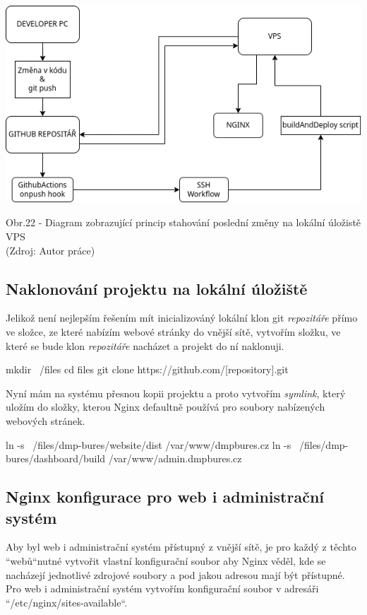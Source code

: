 \documentclass[12pt,a4paper]{report}
\begin{document}
  \vspace*{0.5cm}
  \noindent\includegraphics[width=\linewidth]{CIDC_visualization.png}
  \begin{center}
    Obr.22 - Diagram zobrazující princip stahování poslední změny na lokální úložistě VPS \\
    (Zdroj: Autor práce)
  \end{center}
  \vspace*{0.5cm}

  \subsection{Naklonování projektu na lokální úložiště}
  Jelikož není nejlepším řešením mít inicializováný lokální klon git \emph{repozitáře} přímo ve složce, ze které 
  nabízím webové stránky do vnější sítě, vytvořím složku, ve které se bude klon \emph{repozitáře} nacházet a projekt do ní naklonuji.
  \begin{bash}
    mkdir ~/files
    cd files
    git clone https://github.com/[repository].git 
  \end{bash}
  
  Nyní mám na systému přesnou kopii projektu a proto vytvořím \emph{symlink}, který uložím do složky,
  kterou Nginx defaultně používá pro soubory nabízených webových stránek.

  \begin{bash}
    ln -s ~/files/dmp-bures/website/dist /var/www/dmpbures.cz
    ln -s ~/files/dmp-bures/dashboard/build /var/www/admin.dmpbures.cz
  \end{bash}

  \subsection{Nginx konfigurace pro web i administrační systém}
  Aby byl web i administrační systém přístupný z vnější sítě, je pro každý z těchto ``webů``\space nutné  vytvořit 
  vlastní konfigurační soubor aby Nginx věděl, kde se nacházejí jednotlivé zdrojové soubory a 
  pod jakou adresou mají být přístupné.
  Pro web i administrační systém vytvořím konfigurační soubor v adresáři ``/etc/nginx/sites-available``.
  
\end{document}
